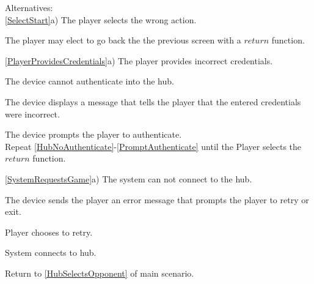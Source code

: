 \documentclass[12pt]{article}
\newenvironment{enumerate*}%
  {\begin{enumerate}%
  	\setlength{\parsep}{0pt}
    \setlength{\itemsep}{0pt}%
    \setlength{\parskip}{0pt}}%
  {\end{enumerate}}
\begin{document}
Alternatives:\\
\ref{SelectStart}a) The player selects the wrong action.
\begin{enumerate*}
\item The player may elect to go back the the previous screen with a 
  $return$ function.
\end{enumerate*}
\ref{PlayerProvidesCredentials}a) The player provides incorrect credentials.
\begin{enumerate*}
\item \label{HubNoAuthenticate}The device cannot authenticate into the hub.
\item The device displays a message that tells the player that the entered 
  credentials were incorrect.
\item \label{PromptAuthenticate}The device prompts the player to 
  authenticate.\\
Repeat \ref{HubNoAuthenticate}-\ref{PromptAuthenticate} until the Player 
  selects the $return$ function.
\end{enumerate*}
\ref{SystemRequestsGame}a) The system can not connect to the hub.
\begin{enumerate*}
\item The device sends the player an error message that prompts the player 
  to retry or exit.
\item Player chooses to retry.
\item System connects to hub.
\item Return to \ref{HubSelectsOpponent} of main scenario.
\end{enumerate*}
\end{document}
